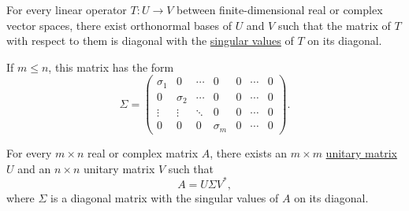 \begin{theorem}\label{thm:singular_value_decomposition}
  \hfill
  \begin{thmenum}
     For every linear operator \( T: U \to V \) between finite-dimensional real or complex vector spaces, there exist orthonormal bases of \( U \) and \( V \) such that the matrix of \( T \) with respect to them is diagonal with the \hyperref[def:singular_value]{singular values} of \( T \) on its diagonal.

    If \( m \leq n \), this matrix has the form
    \begin{equation}\label{eq:thm:singular_value_decomposition/matrix}
      \Sigma
      =
      \begin{pmatrix}
        \sigma_1 & 0        & \cdots & 0        & 0 & \cdots & 0 \\
        0        & \sigma_2 & \cdots & 0        & 0 & \cdots & 0 \\
        \vdots   & \vdots   & \ddots & 0        & 0 & \cdots & 0 \\
        0        & 0        & 0      & \sigma_m & 0 & \cdots & 0
      \end{pmatrix}.
    \end{equation}

     For every \( m \times n \) real or complex matrix \( A \), there exists an \( m \times m \) \hyperref[def:unitary_matrix]{unitary matrix} \( U \) and an \( n \times n \) unitary matrix \( V \) such that
    \begin{equation*}
      A = U \Sigma V^*,
    \end{equation*}
    where \( \Sigma \) is a diagonal matrix with the singular values of \( A \) on its diagonal.
  \end{thmenum}
\end{theorem}
